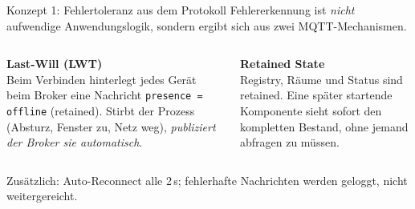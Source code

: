 \documentclass[aspectratio=169,11pt]{beamer}
\begin{document}
\begin{frame}{Konzept 1: Fehlertoleranz aus dem Protokoll}
  Fehlererkennung ist \emph{nicht} aufwendige Anwendungslogik, sondern ergibt sich aus
  zwei MQTT-Mechanismen.

  \vspace{0.8em}
  \begin{columns}[T]
      \textbf{Last-Will (LWT)}\\
      Beim Verbinden hinterlegt jedes Ger\"at beim Broker eine Nachricht
      \texttt{presence = offline} (retained). Stirbt der Prozess (Absturz, Fenster zu,
      Netz weg), \emph{publiziert der Broker sie automatisch}.

      \vspace{0.8em}
      \textbf{Retained State}\\
      Registry, R\"aume und Status sind retained. Eine sp\"ater startende Komponente sieht
      sofort den kompletten Bestand, ohne jemand abfragen zu m\"ussen.

  \end{columns}
  \vspace{0.4em}
  {\small Zus\"atzlich: Auto-Reconnect alle 2\,s; fehlerhafte Nachrichten werden geloggt, nicht weitergereicht.}
\end{frame}
\end{document}
